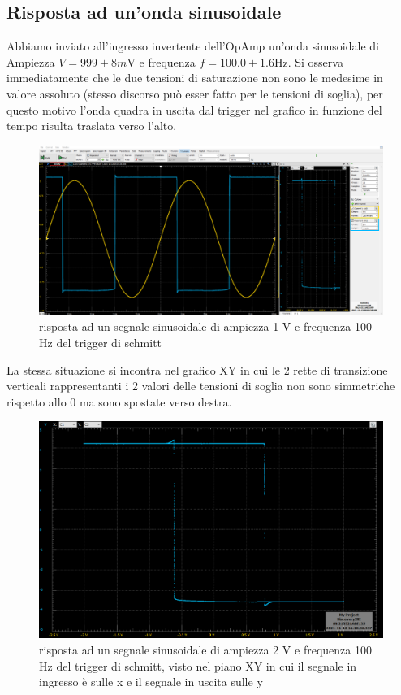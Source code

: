 \documentclass[10pt,a4paper]{article}
\begin{document}
\subsection{Risposta ad un'onda sinusoidale}
Abbiamo inviato all'ingresso invertente dell'OpAmp un'onda sinusoidale di Ampiezza $V =999 \pm 8 \si{m\V}$ e frequenza $f= 100.0 \pm 1.6 \si{\Hz}$. Si osserva immediatamente che le due tensioni di saturazione non sono le medesime in valore assoluto (stesso discorso può esser fatto per le tensioni di soglia), per questo motivo l'onda quadra in uscita dal trigger nel grafico in funzione del tempo risulta traslata verso l'alto.
\begin{figure}[htbp]
\centering
\includegraphics[scale=0.335]{schmitt}
\caption{risposta ad un segnale sinusoidale di ampiezza 1 V e frequenza 100 Hz del trigger di schmitt}
\end{figure}

La stessa situazione si incontra nel grafico XY in cui le 2 rette di transizione verticali rappresentanti i 2 valori delle tensioni di soglia non sono simmetriche rispetto allo 0 ma sono spostate verso destra.
\begin{figure}[htbp]
\centering
\includegraphics[scale=0.4]{shmitt_isteresi}
\caption{risposta ad un segnale sinusoidale di ampiezza 2 V e frequenza 100 Hz del trigger di schmitt, visto nel piano XY in cui il segnale in ingresso è sulle x e il segnale in uscita sulle y}
\end{figure}
\end{document}
